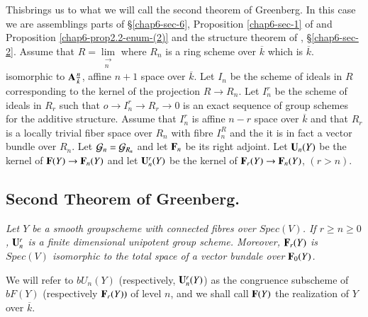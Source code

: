 This\pageoriginale brings us to what we will call the second theorem of Greenberg. In this case we are assemblings parts of \S \ref{chap6-sec-6}, Proposition \ref{chap6-sec-1} of \cite{chap6-keyMG-I} and Proposition \ref{chap6-prop2.2-enum-(2)} and the structure theorem of \cite{chap6-keyMG II}, \S \ref{chap6-sec-2}. Assume that $R= \lim\limits_{\substack{\longrightarrow \\n}}$ where $R_{n}$ is a ring scheme over $\overline{k}$ which is $\overline{k}$. isomorphic to $\mathbf{A}\frac{n}{k}$, affine $n+1$ space over $\overline{k}$. Let $I_{n}$ be the scheme of ideals in $R$ corresponding to the kernel of the projection $R \rightarrow R_{n}$. Let $I_{n}^{r}$ be the scheme of ideals in $R_{r}$ such that $o\rightarrow I_{n}^{r} \rightarrow R_{r}\rightarrow 0$ is an exact sequence of group schemes for the additive structure. Assume that $I_{n}^{r}$ is affine $n-r$ space over $\overline{k}$ and that $R_{r}$ is a locally trivial fiber space over $R_{n}$ with fibre $I_{n}^{R}$ and the it is in fact a vector bundle over $R_{n}$. Let $\mathcal{G}_{n} = \mathcal{G}_{R_{n}}$ and let $\mathbf{F}_{n}$ be its right adjoint. Let $\mathbf{U}_{n}(Y)$ be the kernel of $\mathbf{F}(Y) \rightarrow \mathbf{F}_{n}(Y)$ and let $\mathbf{U}_{n}^{r}(Y)$ be the kernel of $\mathbf{F}_{r}(Y) \rightarrow \mathbf{F}_{n}(Y)$, $(r > n)$. 

\subsection{Second Theorem of Greenberg.}\label{chap6-subsec-12.2}
\textit{Let $Y$ be a smooth group\break scheme with connected fibres over $Spec(V)$. If $r \geq n \geq 0$, $\mathbf{U}_{n}^{r}$ is a finite dimensional unipotent group scheme.  Moreover, $\mathbf{F}_{r}(Y)$ is $Spec(V)$ isomorphic to the total space of a vector bundale over $\mathbf{F}_{0}(Y)$.}

We will refer to $bU_{n}(Y)$ (respectively, $\mathbf{U}_{n}^{r}(Y)$) as the congruence subscheme of $bF(Y)$ (respectively $\mathbf{F}_{r}(Y))$ of level $n$, and we shall call $\mathbf{F}(Y)$ the realization of $Y$ over $\overline{k}$.

